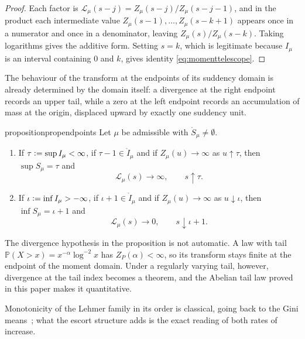 \documentclass[sn-mathphys-num]{sn-jnl}
\theoremstyle{thmstyleone}%
\theoremstyle{thmstyletwo}%
\theoremstyle{thmstylethree}%
\theoremstyle{thmstyleone}%
\providecommand{\Prob}{\mathbb{P}}
\providecommand{\Leh}{\mathscr{L}}
\providecommand{\eqdef}{\mathrel{\vcentcolon=}}
\begin{document}
	\begin{proof}
		Each factor is $\Leh_\mu(s-j)=Z_\mu(s-j)/Z_\mu(s-j-1)$, and in the
		product each intermediate value
		$Z_\mu(s-1),\dots,Z_\mu(s-k+1)$ appears once in a numerator and
		once in a denominator, leaving $Z_\mu(s)/Z_\mu(s-k)$. Taking
		logarithms gives the additive form. Setting $s=k$, which is
		legitimate because $I_\mu$ is an interval containing $0$ and $k$,
		gives identity \eqref{eq:momenttelescope}.
	\end{proof}
	
	The behaviour of the transform at the endpoints of its suddency
	domain is already determined by the domain itself: a divergence at
	the right endpoint records an upper tail, while a zero at the left
	endpoint
	records an accumulation of mass at the origin, displaced upward by
	exactly one suddency unit.
	
	\begin{restatable}[Endpoints]{proposition}{propendpoints}\label{prop:endpoints}
		Let $\mu$ be admissible with $\mathring S_\mu\neq\emptyset$.
		\begin{enumerate}[label=\textup{(\roman*)},leftmargin=2.2em]
			\item If $\tau\eqdef\sup I_\mu<\infty$, if
			$\tau-1\in\mathring I_\mu$ and if $Z_\mu(u)\to\infty$ as
			$u\uparrow\tau$, then $\sup S_\mu=\tau$ and
			\begin{equation}\label{eq:rightendpoint}
				\Leh_\mu(s)\longrightarrow\infty,\qquad s\uparrow\tau .
			\end{equation}
			\item If $\iota\eqdef\inf I_\mu>-\infty$, if
			$\iota+1\in\mathring I_\mu$ and if $Z_\mu(u)\to\infty$ as
			$u\downarrow\iota$, then $\inf S_\mu=\iota+1$ and
			\begin{equation}\label{eq:leftendpoint}
				\Leh_\mu(s)\longrightarrow0,\qquad s\downarrow\iota+1 .
			\end{equation}
		\end{enumerate}
	\end{restatable}
	
	
	The divergence hypothesis in the proposition is not automatic. A
	law with tail $\Prob(X>x)=x^{-\alpha}\log^{-2}x$ has
	$Z_P(\alpha)<\infty$, so its transform stays finite at the
	endpoint of the moment domain. Under a regularly varying tail,
	however, divergence at the tail index becomes a theorem, and the
	Abelian tail law proved in this paper makes it quantitative.
	
	Monotonicity of the Lehmer family in its order is classical, going
	back to the Gini means~\cite{gini1938,bullen2003}; what the escort
	structure adds is the exact reading of both rates of increase.
	
\end{document}
